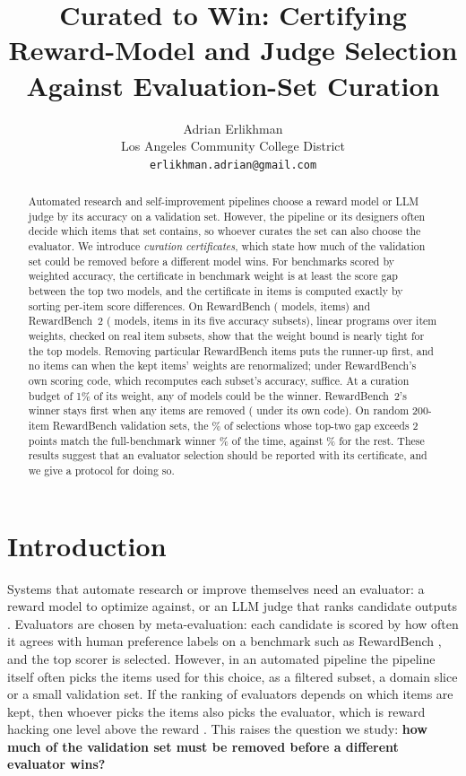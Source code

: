 \documentclass[11pt]{article}
\title{Curated to Win: Certifying Reward-Model and Judge Selection\\Against Evaluation-Set Curation}
\author{Adrian Erlikhman \\
  Los Angeles Community College District \\
  \texttt{erlikhman.adrian@gmail.com}}
\begin{document}
\maketitle

\begin{abstract}
Automated research and self-improvement pipelines choose a reward model or LLM judge by its accuracy on a validation set. However, the pipeline or its designers often decide which items that set contains, so whoever curates the set can also choose the evaluator. We introduce \emph{curation certificates}, which state how much of the validation set could be removed before a different model wins. For benchmarks scored by weighted accuracy, the certificate in benchmark weight is at least the score gap between the top two models, and the certificate in items is computed exactly by sorting per-item score differences. On RewardBench (\OneModels{} models, \OneItems{} items) and RewardBench~2 (\TwoModels{} models, \TwoItems{} items in its five accuracy subsets), linear programs over item weights, checked on real item subsets, show that the weight bound is nearly tight for the top models. Removing \OneCertItems{} particular RewardBench items puts the runner-up first, and no \OneCertItemsSafe{} items can when the kept items' weights are renormalized; under RewardBench's own scoring code, which recomputes each subset's accuracy, \OneOffItems{} suffice. At a curation budget of 1\% of its weight, any of \OnePlausOneLo{} models could be the winner. RewardBench~2's winner stays first when any \TwoCertItemsSafe{} items are removed (\TwoOffItemsSafe{} under its own code). On random 200-item RewardBench validation sets, the \OneValTwoHundredCertShare\% of selections whose top-two gap exceeds 2 points match the full-benchmark winner \OneValTwoHundredCert\% of the time, against \OneValTwoHundredUncert\% for the rest. These results suggest that an evaluator selection should be reported with its certificate, and we give a protocol for doing so.
\end{abstract}

\section{Introduction}

Systems that automate research or improve themselves need an evaluator: a reward model to optimize against, or an LLM judge that ranks candidate outputs \citep{lu2024aiscientist,zheng2023judging}. Evaluators are chosen by meta-evaluation: each candidate is scored by how often it agrees with human preference labels on a benchmark such as RewardBench \citep{lambert2024rewardbench,malik2025rewardbench2}, and the top scorer is selected. However, in an automated pipeline the pipeline itself often picks the items used for this choice, as a filtered subset, a domain slice or a small validation set. If the ranking of evaluators depends on which items are kept, then whoever picks the items also picks the evaluator, which is reward hacking one level above the reward \citep{gao2022overoptimization}. This raises the question we study: \textbf{how much of the validation set must be removed before a different evaluator wins?}
\end{document}
